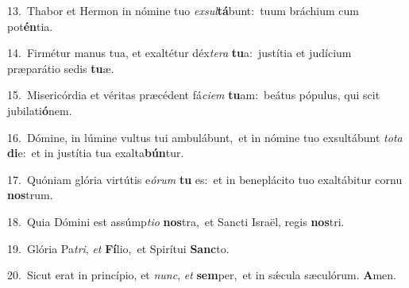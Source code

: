 {\numbfont\textcolor{\numbcolor}{13.}}~Thabor et Hermon in nómine tuo \textit{ex}\-\textit{sul}\textbf{tá}bunt:~\star tuum bráchium cum pot\-\textbf{én}\-tia.\par
{\numbfont\textcolor{\numbcolor}{14.}}~Firmétur manus tua, et exaltétur déx\-\textit{te}\-\textit{ra} \textbf{tu}\-a:~\star justítia et judícium præparátio sedis \textbf{tu}\-æ.\par
{\numbfont\textcolor{\numbcolor}{15.}}~Misericórdia et véritas præcédent fá\-\textit{ci}\-\textit{em} \textbf{tu}\-am:~\star beátus pópulus, qui scit jubilati\-\textbf{ó}\-nem.\par
{\numbfont\textcolor{\numbcolor}{16.}}~Dómine, in lúmine vultus tui ambulábunt,~\dagger et in nómine tuo exsultábunt \textit{to}\-\textit{ta} \textbf{di}\-e:~\star et in justítia tua exalta\-\textbf{bún}\-tur.\par
{\numbfont\textcolor{\numbcolor}{17.}}~Quóniam glória virtútis e\-\textit{ó}\-\textit{rum} \textbf{tu} es:~\star et in beneplácito tuo exaltábitur cornu \textbf{nos}\-trum.\par
{\numbfont\textcolor{\numbcolor}{18.}}~Quia Dómini est assúmp\-\textit{ti}\-\textit{o} \textbf{nos}\-tra,~\star et Sancti Israël, regis \textbf{nos}\-tri.\par
{\numbfont\textcolor{\numbcolor}{19.}}~Glória Pa\-\textit{tri}\-, \textit{et} \textbf{Fí}\-lio,~\star et Spirítui \textbf{Sanc}\-to.\par
{\numbfont\textcolor{\numbcolor}{20.}}~Sicut erat in princípio, et \textit{nunc}\-, \textit{et} \textbf{sem}\-per,~\star et in sǽcula sæculórum. \textbf{A}\-men.\par
